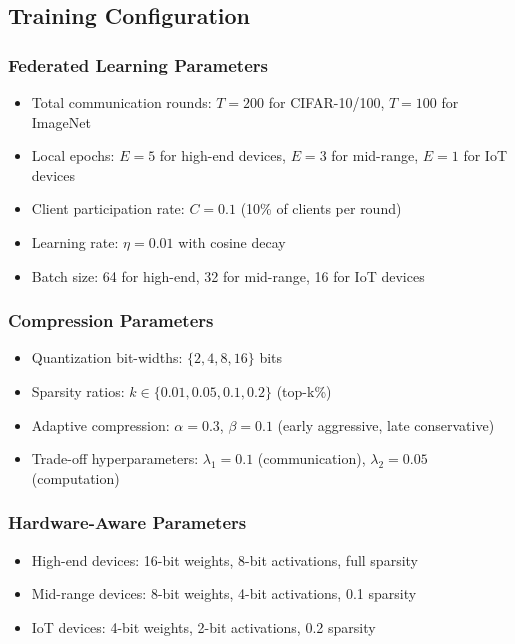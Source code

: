 \documentclass[journal]{IEEEtran}
\begin{document}
\subsection{Training Configuration}

\subsubsection{Federated Learning Parameters}

\begin{itemize}
    \item Total communication rounds: $T = 200$ for CIFAR-10/100, $T = 100$ for ImageNet
    \item Local epochs: $E = 5$ for high-end devices, $E = 3$ for mid-range, $E = 1$ for IoT devices
    \item Client participation rate: $C = 0.1$ (10\% of clients per round)
    \item Learning rate: $\eta = 0.01$ with cosine decay
    \item Batch size: 64 for high-end, 32 for mid-range, 16 for IoT devices
\end{itemize}

\subsubsection{Compression Parameters}

\begin{itemize}
    \item Quantization bit-widths: $\{2, 4, 8, 16\}$ bits
    \item Sparsity ratios: $k \in \{0.01, 0.05, 0.1, 0.2\}$ (top-k\%) 
    \item Adaptive compression: $\alpha = 0.3$, $\beta = 0.1$ (early aggressive, late conservative)
    \item Trade-off hyperparameters: $\lambda_1 = 0.1$ (communication), $\lambda_2 = 0.05$ (computation)
\end{itemize}

\subsubsection{Hardware-Aware Parameters}

\begin{itemize}
    \item High-end devices: 16-bit weights, 8-bit activations, full sparsity
    \item Mid-range devices: 8-bit weights, 4-bit activations, 0.1 sparsity
    \item IoT devices: 4-bit weights, 2-bit activations, 0.2 sparsity
\end{itemize}
\end{document}
